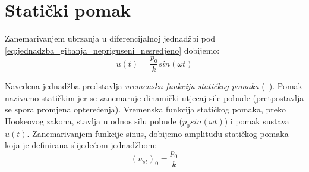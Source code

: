 \section{Statički pomak}
Zanemarivanjem ubrzanja u diferencijalnoj jednadžbi pod
\eqref{eq:jednadzba_gibanja_nepriguseni_nesredjeno} dobijemo:
\begin{equation}\label{eq:vremenska_funkcija_statickog_pomaka}
	u(t)=\frac{p_0}{k}sin(\omega t)
\end{equation}

Navedena jednadžba predstavlja \textit{vremensku funkciju statičkog pomaka} (~\cite{dk_skripta}). Pomak
nazivamo statičkim jer se zanemaruje dinamički utjecaj sile pobude (pretpostavlja se
spora promjena opterećenja).
Vremenska funkcija statičkog pomaka, preko Hookeovog zakona, stavlja u odnos silu 
pobude ($p_0sin(\omega t)$) i pomak sustava $u(t)$. Zanemarivanjem funkcije sinus, dobijemo
amplitudu statičkog pomaka koja je definirana slijedećom jednadžbom:
\begin{equation}
	(u_{st})_0 = \frac{p_0}{k}
\end{equation}


